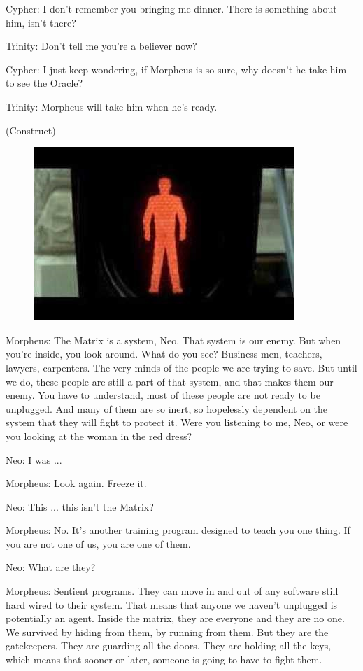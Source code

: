 \documentclass{ctexart}
\newenvironment{myquote}{\color{green} \setlength{\leftskip}{6em} \setlength{\rightskip}{4em} \setlength{\parindent}{-2em}}{\par}
\begin{document}
\begin{myquote}
Cypher: I don't remember you bringing me dinner. There is something about him, isn't there?

Trinity: Don't tell me you're a believer now?

Cypher: I just keep wondering, if Morpheus is so sure, why doesn't he take him to see the Oracle?

Trinity: Morpheus will take him when he's ready.

(Construct)

\begin{figure}[htb]
\centering
\includegraphics[width=0.5\linewidth]{fig/read_Matrix-33}
\end{figure}

Morpheus: The Matrix is a system, Neo. That system is our enemy. But when you're inside, you look around. What do you see? Business men, teachers, lawyers, carpenters. The very minds of the people we are trying to save. But until we do, these people are still a part of that system, and that makes them our enemy. You have to understand, most of these people are not ready to be unplugged. And many of them are so inert, so hopelessly dependent on the system that they will fight to protect it. Were you listening to me, Neo, or were you looking at the woman in the red dress?

Neo: I was ...

Morpheus: Look again. Freeze it.

Neo: This ... this isn't the Matrix?

Morpheus: No. It's another training program designed to teach you one thing. If you are not one of us, you are one of them.

Neo: What are they?

Morpheus: Sentient programs. They can move in and out of any software still hard wired to their system. That means that anyone we haven't unplugged is potentially an agent. Inside the matrix, they are everyone and they are no one. We survived by hiding from them, by running from them. But they are the gatekeepers. They are guarding all the doors. They are holding all the keys, which means that sooner or later, someone is going to have to fight them.


\end{myquote}
\end{document}
